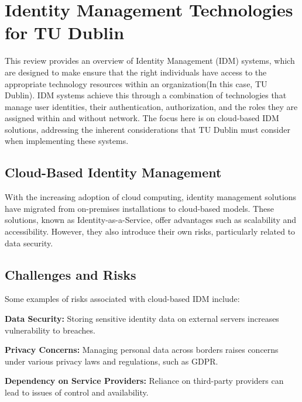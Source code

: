 \documentclass[10pt]{article}
\begin{document}
\section{Identity Management Technologies for TU Dublin}
This review provides an overview of Identity Management (IDM) systems, which are
designed to make ensure that the right individuals have access to the
appropriate technology resources within an organization(In this case, TU
Dublin). IDM systems achieve this through a combination of technologies that
manage user identities, their authentication, authorization, and the roles they
are assigned within and without network.\cite{loginradius2023} The focus here is
on cloud-based IDM solutions, addressing the inherent considerations that TU
Dublin must consider when implementing these systems.
\vspace*{0.5cm}

\subsection{Cloud-Based Identity Management}
With the increasing adoption of cloud computing, identity management solutions
have migrated from on-premises installations to cloud-based models. These
solutions, known as Identity-as-a-Service, offer advantages such as
scalability and accessibility. However, they also introduce their own risks,
particularly related to data security.\cite{secureauth2023}
\vspace*{0.5cm}

\subsection{Challenges and Risks}
Some examples of risks associated with cloud-based IDM include:
\begin{description}[leftmargin=!,labelwidth=0pt,itemindent=0pt]
	\item[] \textbf{Data Security:} Storing sensitive identity data on external
	      servers increases vulnerability to breaches.\cite{ahmadi2024cloud}
	\item[] \textbf{Privacy Concerns:} Managing personal data across borders
	      raises concerns under various privacy laws and regulations, such as
	      GDPR.\cite{gdpr-info}
	\item[] \textbf{Dependency on Service Providers:} Reliance on third-party
	      providers can lead to issues of control and
	      availability.\cite{secureauth2023}
\end{description}
\vspace*{0.5cm}
\end{document}

